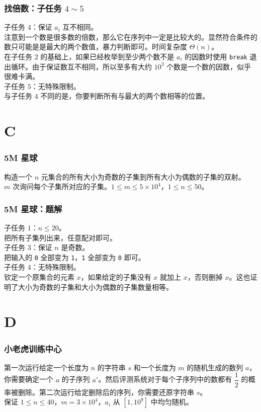 \documentclass{beamer}
\begin{document}
\begin{frame}
\frametitle{找倍数：子任务 $4 \sim 5$}
子任务 $4$：保证 $a_i$ 互不相同。\\
\pause
注意到一个数是很多数的倍数，那么它在序列中一定是比较大的。显然符合条件的数只可能是是最大的两个数值，暴力判断即可。时间复杂度 $\Theta(n)$。\\
\pause
在子任务 $2$ 的基础上，如果已经枚举到至少两个数不是 $a_i$ 的因数时使用 \texttt{break} 退出循环。由于保证数互不相同，所以至多有大约 $10^3$ 个数是一个数的因数，似乎很难卡满。\\
\pause
子任务 $5$：无特殊限制。\\
\pause
与子任务 $4$ 不同的是，你要判断所有与最大的两个数相等的位置。
\end{frame}

\section{C}

\begin{frame}
\frametitle{5M 星球}
构造一个 $n$ 元集合的所有大小为奇数的子集到所有大小为偶数的子集的双射。\\
$m$ 次询问每个子集所对应的子集。$1 \leq m \leq 5 \times 10^4$，$1 \leq n \leq 50$。
\end{frame}

\begin{frame}
\frametitle{5M 星球：题解}
子任务 $1$：$n \leq 20$。\\
\pause
把所有子集列出来，任意配对即可。\\
\pause
子任务 $3$：保证 $n$ 是奇数。\\
\pause
把输入的 \texttt{0} 全部变为 \texttt{1}，\texttt{1} 全部变为 \texttt{0} 即可。\\
\pause
子任务 $4$：无特殊限制。\\
\pause
钦定一个原集合的元素 $x$，如果给定的子集没有 $x$ 就加上 $x$，否则删掉 $x$。这也证明了大小为奇数的子集和大小为偶数的子集数量相等。
\end{frame}

\section{D}

\begin{frame}
\frametitle{小老虎训练中心}
第一次运行给定一个长度为 $n$ 的字符串 $s$ 和一个长度为 $m$ 的随机生成的数列 $a$，你需要确定一个 $a$ 的子序列 $a'$。然后评测系统对于每个子序列中的数都有 $\dfrac 12$ 的概率被删除。第二次运行给定删除后的序列，你需要还原字符串 $s$。\\
保证 $1 \leq n \leq 40$，$m = 3 \times 10^4$，$a_i$ 从 $[1, 10^9]$ 中均匀随机。
\end{frame}
\end{document}
